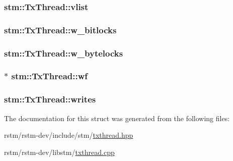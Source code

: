 \hypertarget{structstm_1_1TxThread_ab0a99f4dabcc76bb13511826b5ca17b0}{
\subsubsection[{vlist}]{ stm\-::\-Tx\-Thread\-::vlist}}\label{structstm_1_1TxThread_ab0a99f4dabcc76bb13511826b5ca17b0}
\hypertarget{structstm_1_1TxThread_aa1e85036502f836c839c955492d032d8}{
\subsubsection[{w\-\_\-bitlocks}]{ stm\-::\-Tx\-Thread\-::w\-\_\-bitlocks}}\label{structstm_1_1TxThread_aa1e85036502f836c839c955492d032d8}
\hypertarget{structstm_1_1TxThread_afbc2426149ce9ae27669c064e964af7f}{
\subsubsection[{w\-\_\-bytelocks}]{ stm\-::\-Tx\-Thread\-::w\-\_\-bytelocks}}\label{structstm_1_1TxThread_afbc2426149ce9ae27669c064e964af7f}
\hypertarget{structstm_1_1TxThread_a5b48bc27f158b85229862ac5a1e2b279}{
\subsubsection[{wf}]{$\ast$ stm\-::\-Tx\-Thread\-::wf}}\label{structstm_1_1TxThread_a5b48bc27f158b85229862ac5a1e2b279}
\hypertarget{structstm_1_1TxThread_ab70bb974af78d5b89b57f08c93ec43ef}{
\subsubsection[{writes}]{ stm\-::\-Tx\-Thread\-::writes}}\label{structstm_1_1TxThread_ab70bb974af78d5b89b57f08c93ec43ef}


The documentation for this struct was generated from the following files\-:\begin{DoxyCompactItemize}
\item 
rstm/rstm-\/dev/include/stm/\hyperlink{txthread_8hpp}{txthread.\-hpp}\item 
rstm/rstm-\/dev/libstm/\hyperlink{txthread_8cpp}{txthread.\-cpp}\end{DoxyCompactItemize}
